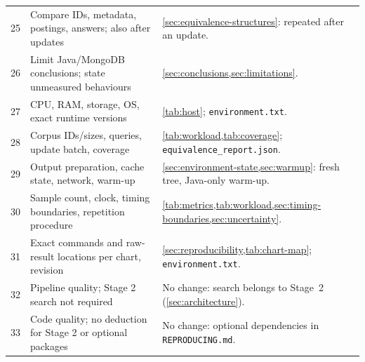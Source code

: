 \begin{center}
\begin{longtable}{@{}lp{4.2cm}p{11.2cm}@{}}
    25 & Compare IDs, metadata, postings, answers; also after updates &
    \cref{sec:equivalence-structures}: repeated after an update. \\
    26 & Limit Java/MongoDB conclusions; state unmeasured behaviours &
    \cref{sec:conclusions,sec:limitations}. \\
    27 & CPU, RAM, storage, OS, exact runtime versions &
    \cref{tab:host}; \texttt{environment.txt}. \\
    28 & Corpus IDs/sizes, queries, update batch, coverage &
    \cref{tab:workload,tab:coverage}; \texttt{equivalence\_report.json}. \\
    29 & Output preparation, cache state, network, warm-up &
    \cref{sec:environment-state,sec:warmup}: fresh tree, Java-only warm-up. \\
    30 & Sample count, clock, timing boundaries, repetition procedure &
    \cref{tab:metrics,tab:workload,sec:timing-boundaries,sec:uncertainty}. \\
    31 & Exact commands and raw-result locations per chart, revision &
    \cref{sec:reproducibility,tab:chart-map}; \texttt{environment.txt}. \\
    32 & Pipeline quality; Stage 2 search not required &
    No change: search belongs to Stage~2 (\cref{sec:architecture}). \\
    33 & Code quality; no deduction for Stage 2 or optional packages &
    No change: optional dependencies in \texttt{REPRODUCING.md}. \\
    \bottomrule
\end{longtable}
\end{center}
